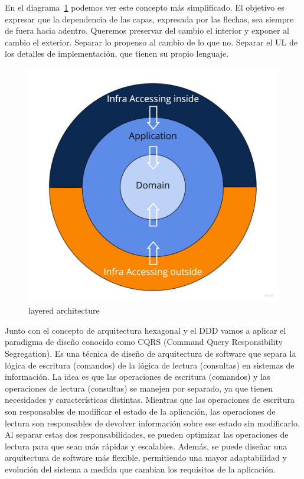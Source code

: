 En el diagrama~\cref{fig:layers} podemos ver este concepto más simplificado. El objetivo es expresar que la dependencia de las capas, expresada por las flechas, sea siempre de fuera hacia adentro. Queremos preservar del cambio el interior y exponer al cambio el exterior. Separar lo propenso al cambio de lo que no. Separar el UL de los detalles de implementación, que tienen su propio lenguaje.

\begin{figure}[H]
    \centering
    \includegraphics[height=0.3\textheight]{./part/Proyecto_ejecutivo/memoria_descriptiva/infoPreviaAntecedentes/img/PFM - Layer}
    \caption{layered architecture}\label{fig:layers}
\end{figure}

Junto con el concepto de arquitectura hexagonal y el DDD vamos a aplicar el paradigma de diseño conocido como \gls{CQRS} (Command Query Responsibility Segregation). Es una técnica de diseño de arquitectura de software que separa la lógica de escritura (comandos) de la lógica de lectura (consultas) en sistemas de información. La idea es que las operaciones de escritura (comandos) y las operaciones de lectura (consultas) se manejen por separado, ya que tienen necesidades y características distintas. Mientras que las operaciones de escritura son responsables de modificar el estado de la aplicación, las operaciones de lectura son responsables de devolver información sobre ese estado sin modificarlo. Al separar estas dos responsabilidades, se pueden optimizar las operaciones de lectura para que sean más rápidas y escalables. Además, se puede diseñar una arquitectura de software más flexible, permitiendo una mayor adaptabilidad y evolución del sistema a medida que cambian los requisitos de la aplicación.

